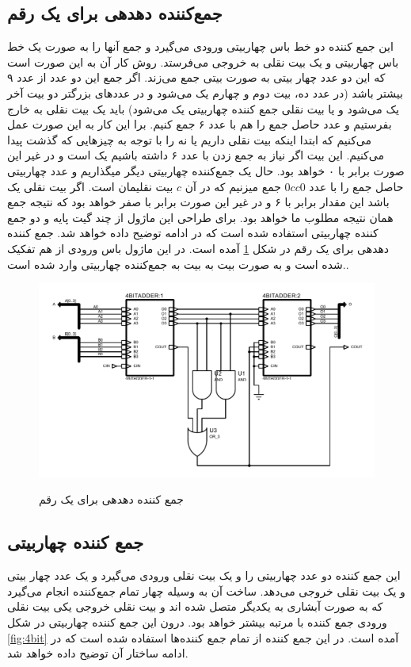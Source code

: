 \documentclass{article}
\begin{document}
\subsection{جمع‌کننده دهدهی برای یک رقم}
این جمع کننده دو خط باس چهاربیتی ورودی می‌گیرد و جمع آنها را به صورت یک خط باس چهاربیتی و یک بیت نقلی به خروجی می‌فرستد. روش کار آن به این صورت است که این دو عدد چهار بیتی به صورت بیتی جمع می‌زند. اگر جمع این دو عدد از عدد ۹ بیشتر باشد (در عدد ده، بیت دوم و چهارم یک می‌شود و در عدد‌های بزرگتر دو بیت آخر یک می‌شود و یا بیت نقلی جمع کننده چهاربیتی یک می‌شود) باید یک بیت نقلی به خارج بفرستیم و عدد حاصل جمع را هم با عدد ۶ جمع کنیم. برا این کار به این صورت عمل می‌کنیم که ابتدا اینکه بیت نقلی داریم یا نه را با توجه به چیز‌هایی که گذشت پیدا می‌کنیم. این بیت اگر نیاز به جمع زدن با عدد ۶ داشته باشیم یک است و در غیر این صورت برابر با ۰ خواهد بود. حال یک جمع‌کننده چهاربیتی دیگر میگذاریم و عدد چهاربیتی حاصل جمع را با عدد $0cc0$ جمع میزنیم که در آن $c$ بیت نقلیمان است. اگر بیت نقلی یک باشد این مقدار برابر با ۶ و در غیر این صورت برابر با صفر خواهد بود که نتیجه جمع همان نتیجه مطلوب ما خواهد بود. برای طراحی این ماژول از چند گیت پایه و دو جمع کننده چهاربیتی استفاده شده است که در ادامه توضیح داده‌ خواهد شد. جمع کننده دهدهی برای یک رقم در شکل \ref{fig:bcd} آمده است. در این ماژول باس ورودی از هم تفکیک شده است و به صورت بیت به بیت به جمع‌کننده چهاربیتی وارد شده است..

\begin{figure}
	\centering
	\includegraphics[scale=0.5]{./captures/bcd}
	\label{fig:bcd}
	\caption{جمع کننده دهدهی برای یک رقم}
\end{figure}

\subsection{جمع کننده چهاربیتی}
این جمع کننده دو عدد چهاربیتی را و یک بیت نقلی ورودی می‌گیرد و یک عدد چهار بیتی و یک بیت نقلی خروجی می‌دهد. ساخت آن به وسیله چهار تمام جمع‌کننده انجام می‌گیرد که به صورت آبشاری به یکدیگر متصل شده اند و بیت نقلی خروجی یکی بیت نقلی ورودی جمع کننده با مرتبه بیشتر خواهد بود. درون این جمع کننده چهاربیتی در شکل \ref{fig:4bit} آمده است. در این جمع کننده از تمام جمع کننده‌ها استفاده شده است که در ادامه ساختار آن توضیح داده خواهد شد.
\end{document}
